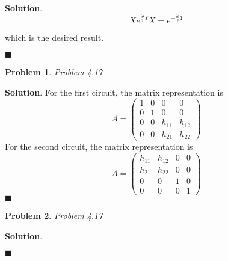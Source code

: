 \documentclass[12pt]{article}
\newtheorem{p}{Problem}
\theoremstyle{definition}
\newenvironment{s}{%
        \begin{trivlist} \item \textbf{Solution}. }{%
            \hspace*{\fill} $\blacksquare$\end{trivlist}}%
\begin{document}
{\begin{s}
\begin{equation*}
X e^{\frac{i\theta}{2}Y} X = e^{-\frac{i\theta}{2}Y}
\end{equation*}

which is the desired result.

\end{s}

\begin{p}
Problem 4.17
\end{p}

\begin{s}
For the first circuit, the matrix representation is
\begin{equation*}
A = \begin{pmatrix}1 & 0 & 0 & 0\\
0 & 1 & 0 & 0\\
0 & 0 & h_{11} & h_{12}\\
0 & 0 & h_{21} & h_{22}
\end{pmatrix}
\end{equation*}
For the second circuit, the matrix representation is
\begin{equation*}
A = \begin{pmatrix} h_{11} & h_{12} & 0 & 0\\
h_{21} & h_{22} & 0 & 0\\
0 & 0 & 1 & 0\\
0 & 0 & 0 & 1
\end{pmatrix}
\end{equation*}
\end{s}

\begin{p}
Problem 4.17
\end{p}

\begin{s}

\end{s}
\end{document}
